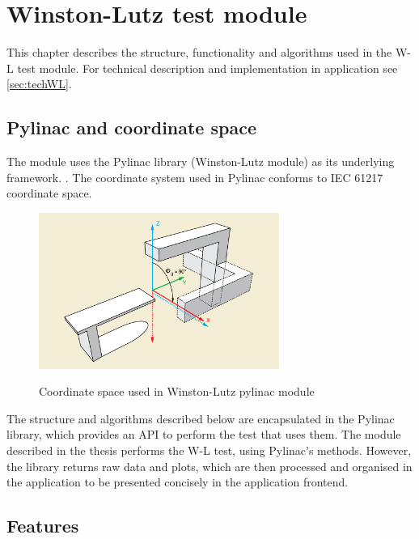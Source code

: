 \chapter{Winston-Lutz test module} \label{chr:wlTest}

This chapter describes the structure, functionality and algorithms used in the W-L test module. For technical description and implementation in application see \autoref{sec:techWL}.

\section{Pylinac and coordinate space}

The module uses the Pylinac library (Winston-Lutz module) as its underlying framework. \cite{pylinac_wl_algorithm}. The coordinate system used in Pylinac conforms to IEC 61217 coordinate space. \cite{iec_61217}

\begin{figure}[H]
    \centering
    \includegraphics[width=0.7\textwidth]{Content/Images/pylinac_coordinate_space.png}
    \caption{Coordinate space used in Winston-Lutz pylinac module} \cite{iec_61217}
\end{figure}

The structure and algorithms described below are encapsulated in the Pylinac library, which provides an API to perform the test that uses them. The module described in the thesis performs the W-L test, using Pylinac's methods. However, the library returns raw data and plots, which are then processed and organised in the application to be presented concisely in the application frontend.

\section{Features}


